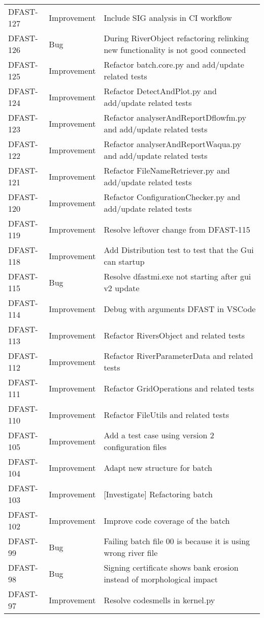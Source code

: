 \documentclass[git]{deltares_manual}
\begin{document}
\begin{longtable}{l|l|p{8cm}}
DFAST-127 & Improvement & Include SIG analysis in CI workflow \\
DFAST-126 & Bug & During RiverObject refactoring relinking new functionality is not good connected \\
DFAST-125 & Improvement & Refactor batch.core.py and add/update related tests \\
DFAST-124 & Improvement & Refactor DetectAndPlot.py and add/update related tests \\
DFAST-123 & Improvement & Refactor analyserAndReportDflowfm.py and add/update related tests \\
DFAST-122 & Improvement & Refactor analyserAndReportWaqua.py and add/update related tests \\
DFAST-121 & Improvement & Refactor FileNameRetriever.py and add/update related tests \\
DFAST-120 & Improvement & Refactor ConfigurationChecker.py and add/update related tests \\
DFAST-119 & Improvement & Resolve leftover change from DFAST-115 \\
DFAST-118 & Improvement & Add Distribution test to test that the Gui can startup \\
DFAST-115 & Bug & Resolve dfastmi.exe not starting after gui v2 update \\
DFAST-114 & Improvement & Debug with arguments DFAST in VSCode \\
DFAST-113 & Improvement & Refactor RiversObject and related tests \\
DFAST-112 & Improvement & Refactor RiverParameterData and related tests \\
DFAST-111 & Improvement & Refactor GridOperations and related tests \\
DFAST-110 & Improvement & Refactor FileUtils and related tests \\
DFAST-105 & Improvement & Add a test case using version 2 configuration files \\
DFAST-104 & Improvement & Adapt new structure for batch \\
DFAST-103 & Improvement & [Investigate] Refactoring batch \\
DFAST-102 & Improvement & Improve code coverage of the batch \\
DFAST-99 & Bug & Failing batch file 00 is because it is using wrong river file \\
DFAST-98 & Bug & Signing certificate shows bank erosion instead of morphological impact \\
DFAST-97 & Improvement & Resolve codesmells in kernel.py \\

\end{longtable}
\end{document}
